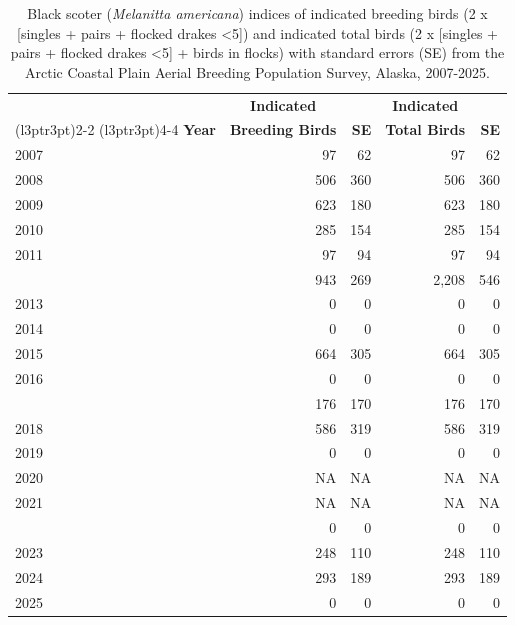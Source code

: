 \documentclass[
]{article}
\begin{document}
\begin{longtable}[t]{lrrrr}

\caption{\label{tbl-BLSC}Black scoter (\emph{Melanitta americana})
indices of indicated breeding birds (2 x {[}singles + pairs + flocked
drakes \textless5{]}) and indicated total birds (2 x {[}singles + pairs
+ flocked drakes \textless5{]} + birds in flocks) with standard errors
(SE) from the Arctic Coastal Plain Aerial Breeding Population Survey,
Alaska, 2007-2025.}

\tabularnewline

\\
\toprule
\multicolumn{1}{c}{\textbf{ }} & \multicolumn{1}{c}{\textbf{Indicated}} & \multicolumn{1}{c}{\textbf{ }} & \multicolumn{1}{c}{\textbf{Indicated}} & \multicolumn{1}{c}{\textbf{ }} \\
\cmidrule(l{3pt}r{3pt}){2-2} \cmidrule(l{3pt}r{3pt}){4-4}
\textbf{Year} & \textbf{Breeding Birds} & \textbf{SE} & \textbf{Total Birds} & \textbf{SE}\\
\midrule
2007 & 97 & 62 & 97 & 62\\
2008 & 506 & 360 & 506 & 360\\
2009 & 623 & 180 & 623 & 180\\
2010 & 285 & 154 & 285 & 154\\
2011 & 97 & 94 & 97 & 94\\
\addlinespace
2012 & 943 & 269 & 2,208 & 546\\
2013 & 0 & 0 & 0 & 0\\
2014 & 0 & 0 & 0 & 0\\
2015 & 664 & 305 & 664 & 305\\
2016 & 0 & 0 & 0 & 0\\
\addlinespace
2017 & 176 & 170 & 176 & 170\\
2018 & 586 & 319 & 586 & 319\\
2019 & 0 & 0 & 0 & 0\\
2020 & NA & NA & NA & NA\\
2021 & NA & NA & NA & NA\\
\addlinespace
2022 & 0 & 0 & 0 & 0\\
2023 & 248 & 110 & 248 & 110\\
2024 & 293 & 189 & 293 & 189\\
2025 & 0 & 0 & 0 & 0\\
\bottomrule

\end{longtable}

\endgroup{}

\newpage{}
\end{document}
